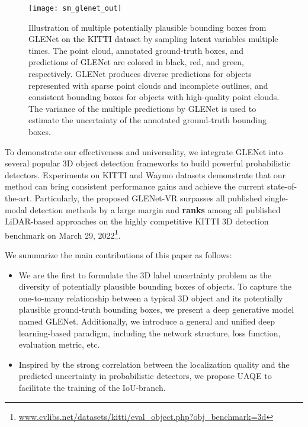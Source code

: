 \documentclass[twocolumn]{svjour3}
\newcommand{\revise}[1]{\textcolor{black}{#1}}
\begin{document}
\begin{figure*}[htp]
\centering
\texttt{[image: sm\_glenet\_out]}
\caption{Illustration of multiple potentially plausible bounding boxes from GLENet \revise{on the KITTI dataset} by sampling \revise{latent} variables multiple times. The point cloud, annotated ground-truth boxes, and predictions of GLENet are colored in black, red, and green, respectively. GLENet produces diverse predictions for objects represented with sparse point clouds and incomplete outlines, and consistent bounding boxes for objects with high-quality point clouds. The variance of the multiple predictions by GLENet is used to estimate the uncertainty of the annotated ground-truth bounding boxes.}
\label{fig:plenet_out}
\end{figure*}


To demonstrate our effectiveness and universality, we integrate GLENet into several popular 3D object detection frameworks to build powerful probabilistic detectors. Experiments on KITTI \citep{Geiger_KITTI} and Waymo \citep{Sun_2020_CVPR} datasets demonstrate that our method can bring consistent performance gains and achieve the current state-of-the-art. Particularly, the proposed GLENet-VR surpasses all published single-modal detection methods by a large margin and \textbf{ranks } among all published LiDAR-based approaches on the highly competitive KITTI 3D detection benchmark on March 29, 2022\footnote{
\href{www.cvlibs.net/datasets/kitti/eval_object.php?obj_benchmark=3d}{www.cvlibs.net/datasets/kitti/eval\_object.php?obj\_benchmark=3d}
}. 

We summarize the main contributions of this paper as follows:

\begin{itemize}
\item We are the first to formulate the 3D label uncertainty problem as the diversity of potentially plausible bounding boxes of objects. To capture the one-to-many relationship between a typical 3D object and its potentially plausible ground-truth bounding boxes, we present a deep generative model named GLENet. Additionally, we introduce a general and unified deep learning-based paradigm, including the network structure, loss function, evaluation metric, etc.
\item Inspired by the strong correlation between the localization quality and the predicted uncertainty in probabilistic detectors, we propose UAQE to facilitate the training of the IoU-branch.
\end{itemize}
\end{document}
